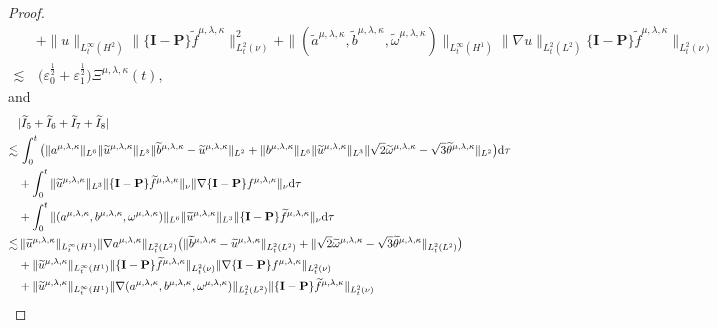 \documentclass[reqno,11pt]{amsart}
\theoremstyle{plain}
\numberwithin{equation}{section}
\newcommand{\eps}{{\varepsilon}}
\begin{document}
\begin{proof}
\begin{align}
 &+\|u\|_{L_t^\infty(H^2)} \|\{\mathbf{I}-\mathbf{P}\}\widetilde{f}^{\mu,\lambda,\kappa}\|_{L_t^2(\nu)}^2 +\|(\widetilde{a}^{\mu,\lambda,\kappa},\widetilde{b}^{\mu,\lambda,\kappa}
 ,\widetilde{\omega}^{\mu,\lambda,\kappa})\|_{L_t^\infty(H^1)}\|\nabla u\|_{L_t^2(L^2)}\{\mathbf{I}-\mathbf{P}\}\widetilde{f}^{\mu,\lambda,\kappa}\|_{L_t^2(\nu)}\nonumber\\
 \lesssim&\, \big(\eps_0^\frac{1}{2}+\eps_1^\frac{1}{2}\big){\Xi} ^{\mu,\lambda,\kappa}(t),
\end{align}
and
\begin{align}\label{G4.10}
&|\widetilde{I}_5+\widetilde{I}_6+\widetilde{I}_7+\widetilde{I}_8|\nonumber\\
\lesssim&\, \int_0^t\big(\| {a}^{\mu,\lambda,\kappa}\|_{L^6}\|\widetilde{u}^{\mu,\lambda,\kappa}\|_{L^3}\|\widetilde{b}^{\mu,\lambda,\kappa}-\widetilde{u}^{\mu,\lambda,\kappa}\|_{L^2}+\| {b}^{\mu,\lambda,\kappa}\|_{L^6}\|\widetilde{u}^{\mu,\lambda,\kappa}\|_{L^3}\|\sqrt{2}\widetilde\omega^{\mu,\lambda,\kappa}-\sqrt{3}\widetilde\theta^{\mu,\lambda,\kappa}\|_{L^2}\big){\rm d}\tau\nonumber\\
&+\int_0^t \|\widetilde{u}^{\mu,\lambda,\kappa}\|_{L^{3}} \|\{\mathbf{I}-\mathbf{P}\}\widetilde{f}^{\mu,\lambda,\kappa}\|_{\nu}\|\nabla\{\mathbf{I}-\mathbf{P}\} {f}^{\mu,\lambda,\kappa}\|_{\nu} {\rm d}\tau\nonumber\\
&+\int_0^t\|( {a}^{\mu,\lambda,\kappa}, {b}^{\mu,\lambda,\kappa}, \omega^{\mu,\lambda,\kappa})\|_{L^6}\|\widetilde{u}^{\mu,\lambda,\kappa}\|_{L^3} \|\{\mathbf{I}-\mathbf{P}\}\widetilde{f}^{\mu,\lambda,\kappa}\|_{\nu} {\rm d}\tau\nonumber\\
 \lesssim&\, \|\widetilde{u}^{\mu,\lambda,\kappa} \|_{L_t^\infty(H^1)}\|\nabla  a^{\mu,\lambda,\kappa}  \|_{L_t^2(L^2)}\big(\|\widetilde{b}^{\mu,\lambda,\kappa}-\widetilde{u}^{\mu,\lambda,\kappa}\|_{L_t^2(L^2)}+\|\sqrt{2}\widetilde{\omega}^{\mu,\lambda,\kappa}-\sqrt{3}\widetilde{\theta}^{\mu,\lambda,\kappa}\|_{L_t^2(L^2)}   \big) \nonumber\\
 &+\|\widetilde{u}^{\mu,\lambda,\kappa} \|_{L_t^\infty(H^1)} \|\{\mathbf{I}-\mathbf{P}\}\widetilde{f}^{\mu,\lambda,\kappa}\|_{L_t^2(\nu)}\|\nabla\{\mathbf{I}-\mathbf{P}\} {f}^{\mu,\lambda,\kappa}\|_{L_t^2(\nu)}   \nonumber\\
 &+\|\widetilde{u}^{\mu,\lambda,\kappa} \|_{L_t^\infty(H^1)}\|\nabla (a^{\mu,\lambda,\kappa},b^{\mu,\lambda,\kappa},\omega^{\mu,\lambda,\kappa})\|_{L_t^2(L^2)}\|\{\mathbf{I}-\mathbf{P}\}\widetilde{f}^{\mu,\lambda,\kappa}\|_{L_t^2(\nu)}\nonumber\\

\end{align}
\end{proof}
\end{document}
